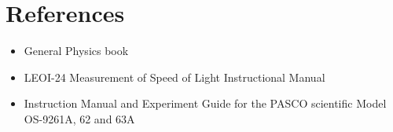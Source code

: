 \documentclass[12pt]{article}
\begin{document}
\clearpage
	
	\section{References}
	\begin{itemize}
		\item General Physics book
		\item LEOI-24 Measurement of Speed of Light Instructional Manual  
		\item Instruction Manual and Experiment Guide for the PASCO scientific Model OS-9261A, 62 and 63A
	\end{itemize}
		
	
	
\end{document}
